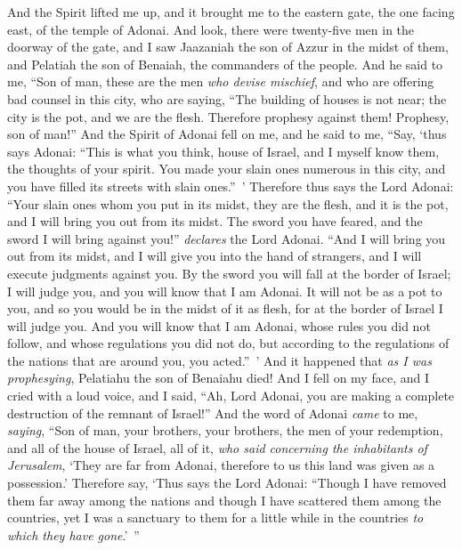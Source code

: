 \begin{biblechapter} %
 And the Spirit lifted me up, and it brought me to the eastern gate, the one facing east, of the temple of Adonai. And look, there were twenty-five men in the doorway of the gate, and I saw Jaazaniah the son of Azzur in the midst of them, and Pelatiah the son of Benaiah, the commanders of the people.
\verse And he said to me, “Son of man, these are the men \textit{who devise mischief}, and who are offering bad counsel in this city,
\verse who are saying, “The building of houses is not near; the city is the pot, and we are the flesh.
\verse Therefore prophesy against them! Prophesy, son of man!”
\verse And the Spirit of Adonai fell on me, and he said to me, “Say, ‘thus says Adonai: “This is what you think, house of Israel, and I myself know them, the thoughts of your spirit.
\verse You made your slain ones numerous in this city, and you have filled its streets with slain ones.” ’
\verse Therefore thus says the Lord Adonai: “Your slain ones whom you put in its midst, they are the flesh, and it is the pot, and I will bring you out from its midst.
\verse The sword you have feared, and the sword I will bring against you!” \textit{declares} the Lord Adonai.
\verse “And I will bring you out from its midst, and I will give you into the hand of strangers, and I will execute judgments against you.
\verse By the sword you will fall at the border of Israel; I will judge you, and you will know that I am Adonai.
\verse It will not be as a pot to you, and so you would be in the midst of it as flesh, for at the border of Israel I will judge you.
\verse And you will know that I am Adonai, whose rules you did not follow, and whose regulations you did not do, but according to the regulations of the nations that are around you, you acted.” ’
\verse And it happened that \textit{as I was prophesying}, Pelatiahu the son of Benaiahu died! And I fell on my face, and I cried with a loud voice, and I said, “Ah, Lord Adonai, you are making a complete destruction of the remnant of Israel!”
\verse And the word of Adonai \textit{came} to me, \textit{saying},
\verse “Son of man, your brothers, your brothers, the men of your redemption, and all of the house of Israel, all of it, \textit{who said concerning the inhabitants of Jerusalem}, ‘They are far from Adonai, therefore to us this land was given as a possession.’
\verse Therefore say, ‘Thus says the Lord Adonai: “Though I have removed them far away among the nations and though I have scattered them among the countries, yet I was a sanctuary to them for a little while in the countries \textit{to which they have gone}.’ ”

\end{biblechapter}
